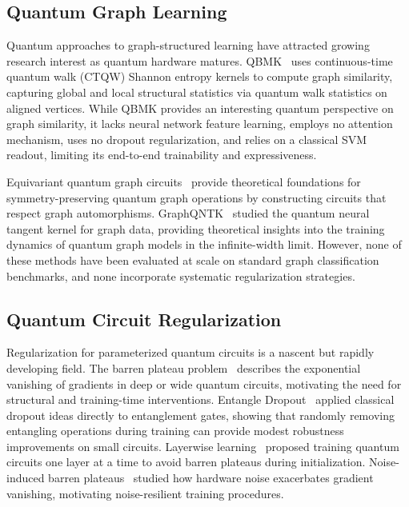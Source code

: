 \documentclass[journal]{IEEEtran}
\begin{document}
\subsection{Quantum Graph Learning}

Quantum approaches to graph-structured learning have attracted growing
research interest as quantum hardware matures. QBMK~\cite{Bai2024ICML}
uses continuous-time quantum walk (CTQW) Shannon entropy kernels to compute
graph similarity, capturing global and local structural statistics via quantum
walk statistics on aligned vertices. While QBMK provides an interesting
quantum perspective on graph similarity, it lacks neural network feature
learning, employs no attention mechanism, uses no dropout regularization,
and relies on a classical SVM readout, limiting its end-to-end trainability
and expressiveness.

Equivariant quantum graph circuits~\cite{Mernyei2022ICML} provide theoretical
foundations for symmetry-preserving quantum graph operations by constructing
circuits that respect graph automorphisms. GraphQNTK~\cite{Tang2022NeurIPS}
studied the quantum neural tangent kernel for graph data, providing theoretical
insights into the training dynamics of quantum graph models in the
infinite-width limit. However, none of these methods have been evaluated at
scale on standard graph classification benchmarks, and none incorporate
systematic regularization strategies.

\subsection{Quantum Circuit Regularization}

Regularization for parameterized quantum circuits is a nascent but rapidly
developing field. The barren plateau problem~\cite{McClean2018} describes
the exponential vanishing of gradients in deep or wide quantum circuits,
motivating the need for structural and training-time interventions.
Entangle Dropout~\cite{EntangleDropout} applied classical dropout ideas
directly to entanglement gates, showing that randomly removing entangling
operations during training can provide modest robustness improvements on
small circuits. Layerwise learning~\cite{Skolik2021} proposed training
quantum circuits one layer at a time to avoid barren plateaus during
initialization. Noise-induced barren plateaus~\cite{Wang2021Noise} studied
how hardware noise exacerbates gradient vanishing, motivating noise-resilient
training procedures.
\end{document}

